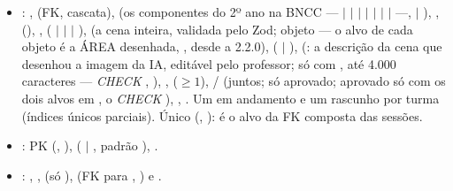 \begin{itemize}
  \item {}: ,  (FK, cascata),
     (os componentes do 2º ano na BNCC ---
     $|$  $|$  $|$
     $|$  $|$  $|$ 
    $|$  ---,  $|$ ), ,  (),
    ,  ( $|$  $|$
     $|$ ),  (a cena inteira, validada
    pelo Zod; objeto --- o alvo de cada objeto é a ÁREA desenhada,
    , desde a 2.2.0),  ( $|$ ),
     (: a descrição da cena que desenhou a
    imagem da IA, editável pelo professor; só com , até
    4.000 caracteres --- \emph{CHECK} ,
    ), ,
     ($\geq 1$), /
    (juntos;  só aprovado; aprovado só com os dois alvos em
    , o \emph{CHECK} ),
    , . Um em andamento e um rascunho por
    turma (índices únicos parciais). Único (, ): é o
    alvo da FK composta das sessões.
  \item {}: PK (, ),
     ( $|$ , padrão ),
    .
  \item {}: , ,
     (só ),  (FK para ,
    ) e .
\end{itemize}

\subsection{}

